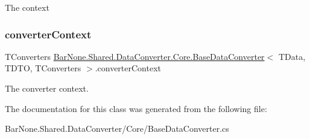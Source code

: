 The context 

\mbox{\label{class_bar_none_1_1_shared_1_1_data_converter_1_1_core_1_1_base_data_converter_aa680c5a5e00d4330616f98e3cacffa42}} 
\subsubsection{\texorpdfstring{converter\+Context}{converterContext}}
{\footnotesize\ttfamily T\+Converters \mbox{\hyperlink{class_bar_none_1_1_shared_1_1_data_converter_1_1_core_1_1_base_data_converter}{Bar\+None.\+Shared.\+Data\+Converter.\+Core.\+Base\+Data\+Converter}}$<$ T\+Data, T\+D\+TO, T\+Converters $>$.converter\+Context\hspace{0.3cm}{\ttfamily [protected]}}



The converter context. 



The documentation for this class was generated from the following file\+:\begin{DoxyCompactItemize}
\item 
Bar\+None.\+Shared.\+Data\+Converter/\+Core/Base\+Data\+Converter.\+cs\end{DoxyCompactItemize}
